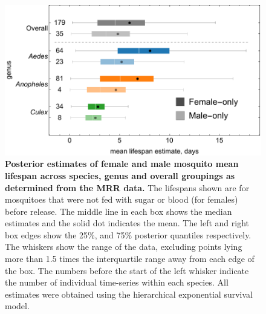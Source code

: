 \documentclass[12pt]{article}
\begin{document}
\begin{figure}[h]
	\centerline{\includegraphics[width=1\textwidth]{./Figure_files/mrr_sexDifferences_without_sugar_nor_blood.pdf}}
	\caption{\textbf{Posterior estimates of female and male mosquito mean lifespan across species, genus and overall groupings as determined from the MRR data.} The lifespans shown are for mosquitoes that were not fed with sugar or blood (for females) before release. The middle line in each box shows the median estimates and the solid dot indicates the mean. The left and right box edges show the 25\%, and 75\% posterior quantiles respectively. The whiskers show the range of the data, excluding points lying more than 1.5 times the interquartile range away from each edge of the box. The numbers before the start of the left whisker indicate the number of individual time-series within each species. All estimates were obtained using the hierarchical exponential survival model.}
	\label{fig:mrr_sexDifferences_without_sugar_nor_blood}
\end{figure}
\end{document}
